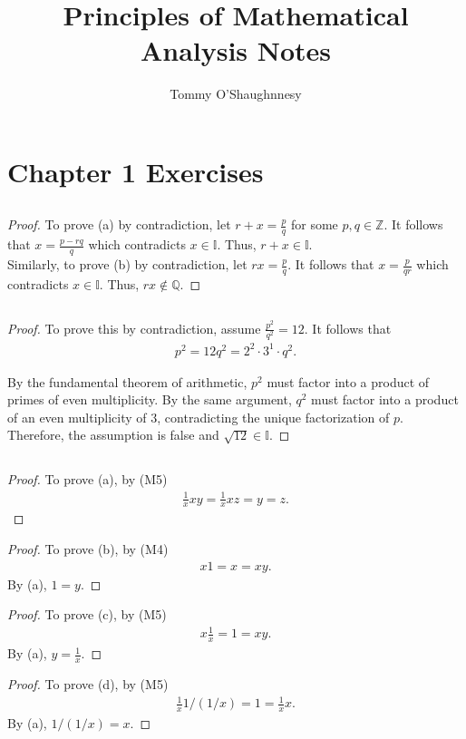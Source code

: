 \documentclass[12pt]{article}
\author{Tommy O'Shaughnnesy}
\title{Principles of Mathematical Analysis Notes}
\begin{document}
\maketitle
\section{Chapter 1 Exercises}
\subsection{}
\begin{proof}
				To prove (a) by contradiction, let $r + x = \frac{p}{q}$ for some $p,q \in \mathbb{Z}$.
				It follows that $x = \frac{p-rq}{q}$ which contradicts $x \in \mathbb{I}$.
				Thus, $r + x \in \mathbb{I}$. \\
				Similarly, to prove (b) by contradiction,
				let $rx = \frac{p}{q}$. It follows that $x = \frac{p}{qr}$ 
				which contradicts $x \in \mathbb{I}$. Thus, $rx \notin \mathbb{Q}$.
\end{proof}
\subsection{}
\begin{proof}
				To prove this by contradiction, assume $\frac{p^{2}}{q^{2}}=12$. It follows that 
				\begin{gather*}
								p^{2}=12q^{2}=2^{2}\cdot3^{1}\cdot q^{2}.
				\end{gather*}
				
								By the fundamental theorem of arithmetic, $p^{2}$ must factor into a
				product of primes of even multiplicity. By the same argument, $q^{2}$ must factor into
				a product of an even multiplicity of $3$, contradicting the unique factorization of $p$.
				Therefore, the assumption is false and $\sqrt{12}\in\mathbb{I}$.
\end{proof}
\subsection{}
\begin{proof}
				To prove (a), by (M5)
				\begin{gather*}
					\frac{1}{x}xy=\frac{1}{x}xz=y=z.
				\end{gather*}
\end{proof}
\begin{proof}
				To prove (b), by (M4)
				\begin{gather*}
								x1=x=xy.
				\end{gather*}
				By (a), $1=y$.
\end{proof}
\begin{proof}
				To prove (c), by (M5)
				\begin{gather*}	
								x\frac{1}{x}=1=xy.
				\end{gather*}	
				By (a), $y=\frac{1}{x}$.
\end{proof}
\begin{proof}
				To prove (d), by (M5)
				\begin{gather*}
								\frac{1}{x}1/(1/x)=1=\frac{1}{x}x.
				\end{gather*}
				By (a), $1/(1/x)=x$.
\end{proof}
\end{document}
